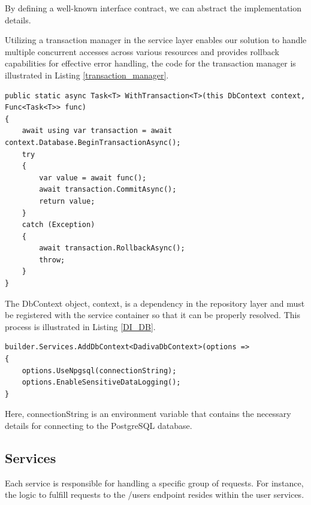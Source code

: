 By defining a well-known interface contract, we can abstract the implementation details.

Utilizing a transaction manager in the service layer enables our solution to handle multiple concurrent accesses across various resources and provides rollback capabilities for effective error handling, the code for the transaction manager is illustrated in Listing \ref{transaction_manager}.

\begin{lstlisting}[style=sharpc, caption={Database transaction wrapper ensuring commit or rollback on exception.}, label={transaction_manager}]
public static async Task<T> WithTransaction<T>(this DbContext context, Func<Task<T>> func)
{
	await using var transaction = await context.Database.BeginTransactionAsync();
	try
	{
		var value = await func();
		await transaction.CommitAsync();
		return value;
	}
	catch (Exception)
	{
		await transaction.RollbackAsync();
		throw;
	}
}
\end{lstlisting}

The DbContext object, context, is a dependency in the repository layer and must be registered with the service container so that it can be properly resolved. This process is illustrated in Listing \ref{DI_DB}.

\begin{lstlisting}[style=sharpc, caption={Registering DbContext in the service container}, label={DI_DB}] 
builder.Services.AddDbContext<DadivaDbContext>(options =>
{
	options.UseNpgsql(connectionString);
	options.EnableSensitiveDataLogging();
} 
\end{lstlisting}

Here, connectionString is an environment variable that contains the necessary details for connecting to the PostgreSQL database.

\newpage

\subsection{Services}
Each service is responsible for handling a specific group of requests. For instance, the logic to fulfill requests to the /users endpoint resides within the user services.


